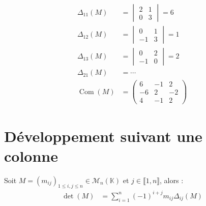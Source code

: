 \documentclass[../main.tex]{subfiles}
\begin{document}
\begin{align*}
    \Delta_{11}(M) &= \begin{vmatrix}
        2 & 1 \\
        0 & 3
    \end{vmatrix} = 6 \\
    \Delta_{12}(M) &= \begin{vmatrix}
        0 & 1 \\
        -1 & 3
    \end{vmatrix} = 1 \\
    \Delta_{13}(M) &= \begin{vmatrix}
        0 & 2 \\
        -1 & 0
    \end{vmatrix} = 2 \\
    \Delta_{21}(M) &= \cdots \\
    \operatorname{Com}(M) &= \begin{pmatrix}
        6 & -1 & 2 \\
        -6 & 2 & -2 \\
        4 & -1 & 2
    \end{pmatrix}
\end{align*}

\section{Développement suivant une colonne}
\begin{tcolorbox}[title=Théorème 30.58, title filled=false, colframe=orange, colback=orange!10!white]
    Soit $M = (m_{ij})_{1\leq i, j\leq n}\in \mathcal{M}_n(\mathbb{K})$ et $j\in \llbracket 1, n \rrbracket$, alors : 
    \begin{align*}
        \operatorname{det}(M) &= \sum_{i=1}^{n} (-1)^{i+j} m_{ij} \Delta_{ij}(M)
    \end{align*}
\end{tcolorbox}
\end{document}
